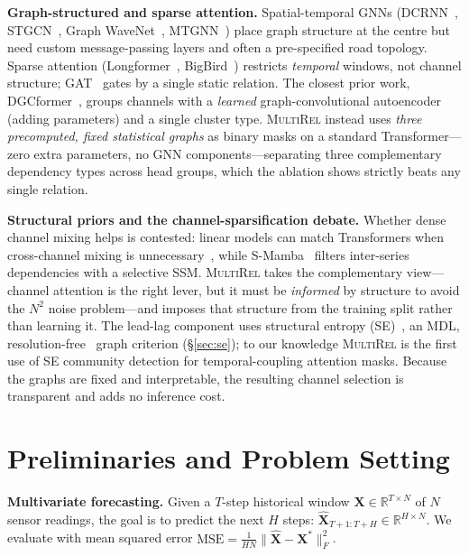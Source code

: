 \documentclass[letterpaper]{article}   %
\newcommand{\mr}{\textsc{MultiRel}}
\begin{document}
\textbf{Graph-structured and sparse attention.}
Spatial-temporal GNNs (DCRNN~\cite{li2018diffusion}, STGCN~\cite{yu2018spatio},
Graph WaveNet~\cite{wu2019graph}, MTGNN~\cite{wu2020connecting}) place graph structure
at the centre but need custom message-passing layers and often a pre-specified road
topology. Sparse attention (Longformer~\cite{beltagy2020longformer},
BigBird~\cite{zaheer2020big}) restricts \emph{temporal} windows, not channel structure;
GAT~\cite{velickovic2018graph} gates by a single static relation. The closest prior work,
DGCformer~\cite{han2024dgcformer}, groups channels with a \emph{learned} graph-convolutional
autoencoder (adding parameters) and a single cluster type. \mr{} instead uses \emph{three
precomputed, fixed statistical graphs} as binary masks on a standard Transformer---zero
extra parameters, no GNN components---separating three complementary dependency types
across head groups, which the ablation shows strictly beats any single relation.

\textbf{Structural priors and the channel-sparsification debate.}
Whether dense channel mixing helps is contested: linear models can match Transformers
when cross-channel mixing is unnecessary~\cite{zeng2023transformers}, while
S-Mamba~\cite{wang2024smamba} filters inter-series dependencies with a selective SSM.
\mr{} takes the complementary view---channel attention is the right lever, but it must
be \emph{informed} by structure to avoid the $N^2$ noise problem---and imposes that
structure from the training split rather than learning it. The lead-lag component uses
structural entropy (SE)~\cite{li2016structural}, an MDL, resolution-free~\cite{fortunato2007resolution}
graph criterion (\S\ref{sec:se}); to our knowledge \mr{} is the first use of SE community
detection for temporal-coupling attention masks. Because the graphs are fixed and
interpretable, the resulting channel selection is transparent and adds no inference cost.

\section{Preliminaries and Problem Setting}
\label{sec:prelim}

\textbf{Multivariate forecasting.}
Given a $T$-step historical window $\mathbf{X}\in\mathbb{R}^{T\times N}$ of $N$
sensor readings, the goal is to predict the next $H$ steps:
$\hat{\mathbf{X}}_{T+1:T+H}\in\mathbb{R}^{H\times N}$.
We evaluate with mean squared error
$\text{MSE}=\frac{1}{HN}\|\hat{\mathbf{X}}-\mathbf{X}^*\|_F^2$.
\end{document}

